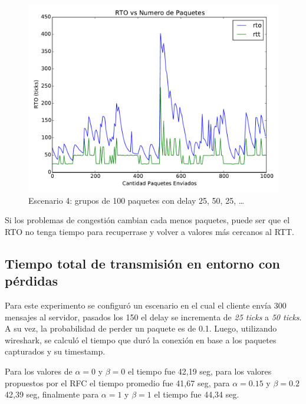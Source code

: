 		\begin{figure}[H]
			\includegraphics[width=\textwidth]{imagenes/congestion_short.pdf}
			\caption*{Escenario 4: grupos de 100 paquetes con delay 25, 50, 25, \ldots}
		\end{figure}

		Si los problemas de congesti\'on cambian cada menos paquetes, puede ser
		que el RTO no tenga tiempo para recuperrase y volver a valores m\'as
		cercanos al RTT.

    \subsection{Tiempo total de transmisi\'on en entorno con p\'erdidas}

        Para este experimento se configur\'o un escenario en el cual el
        cliente env\'ia 300 mensajes al servidor, pasados los 150 el delay
        se incrementa de \textit{25 ticks} a \textit{50 ticks}. A su vez,
        la probabilidad de perder un paquete es de 0.1.
        Luego, utilizando wireshark, se calcul\'o el tiempo que dur\'o la
        conexi\'on en base a los paquetes capturados y su timestamp.

        Para los valores de $\alpha=0$ y $\beta=0$ el tiempo fue 42,19 seg,
        para los valores propuestos por el RFC el tiempo promedio fue
        41,67 seg, para $\alpha=0.15$ y $\beta=0.2$ 42,39 seg, finalmente
        para $\alpha=1$ y $\beta=1$ el tiempo fue 44,34 seg.


